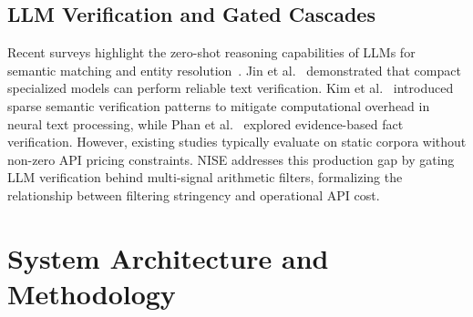 \documentclass[conference]{IEEEtran}
\begin{document}
\subsection{LLM Verification and Gated Cascades}
Recent surveys highlight the zero-shot reasoning capabilities of LLMs for semantic matching and entity resolution~\cite{zhao2023}.
Jin et al.~\cite{jin2023} demonstrated that compact specialized models can perform reliable text verification.
Kim et al.~\cite{kim2022} introduced sparse semantic verification patterns to mitigate computational overhead in neural text processing, while Phan et al.~\cite{phan2021} explored evidence-based fact verification.
However, existing studies typically evaluate on static corpora without non-zero API pricing constraints.
NISE addresses this production gap by gating LLM verification behind multi-signal arithmetic filters, formalizing the relationship between filtering stringency and operational API cost.

\section{System Architecture and Methodology}
\end{document}
